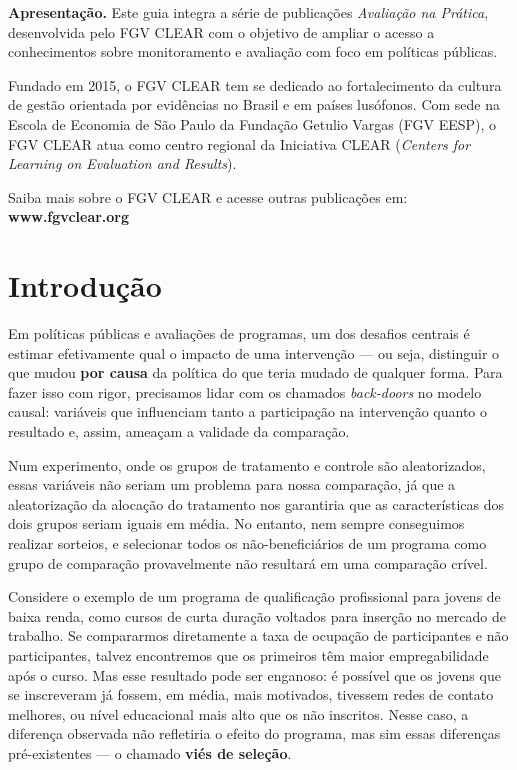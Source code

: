 \documentclass[12pt,a4paper]{article}
\begin{document}
\noindent\textbf{Apresentação.} Este guia integra a série de publicações \textit{Avaliação na Prática}, desenvolvida pelo FGV CLEAR com o objetivo de ampliar o acesso a conhecimentos sobre monitoramento e avaliação com foco em políticas públicas.

Fundado em 2015, o FGV CLEAR tem se dedicado ao fortalecimento da cultura de gestão orientada por evidências no Brasil e em países lusófonos. Com sede na Escola de Economia de São Paulo da Fundação Getulio Vargas (FGV EESP), o FGV CLEAR atua como centro regional da Iniciativa CLEAR (\textit{Centers for Learning on Evaluation and Results}).

Saiba mais sobre o FGV CLEAR e acesse outras publicações em: \textbf{www.fgvclear.org}
\newpage

\tableofcontents
\newpage
\section{Introdução}\label{sec:introducao}

Em políticas públicas e avaliações de programas, um dos desafios centrais é estimar efetivamente qual o impacto de uma intervenção --- ou seja, distinguir o que mudou \textbf{por causa} da política do que teria mudado de qualquer forma. Para fazer isso com rigor, precisamos lidar com os chamados \textit{back-doors} no modelo causal: variáveis que influenciam tanto a participação na intervenção quanto o resultado e, assim, ameaçam a validade da comparação.

Num experimento, onde os grupos de tratamento e controle são aleatorizados, essas variáveis não seriam um problema para nossa comparação, já que a aleatorização da alocação do tratamento nos garantiria que as características dos dois grupos seriam iguais em média. No entanto, nem sempre conseguimos realizar sorteios, e selecionar todos os não-beneficiários de um programa como grupo de comparação provavelmente não resultará em uma comparação crível.

Considere o exemplo de um programa de qualificação profissional para jovens de baixa renda, como cursos de curta duração voltados para inserção no mercado de trabalho. Se compararmos diretamente a taxa de ocupação de participantes e não participantes, talvez encontremos que os primeiros têm maior empregabilidade após o curso. Mas esse resultado pode ser enganoso: é possível que os jovens que se inscreveram já fossem, em média, mais motivados, tivessem redes de contato melhores, ou nível educacional mais alto que os não inscritos. Nesse caso, a diferença observada não refletiria o efeito do programa, mas sim essas diferenças pré-existentes --- o chamado \textbf{viés de seleção}.
\end{document}
